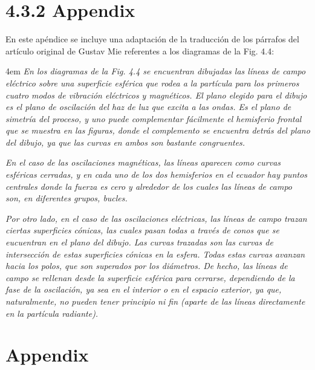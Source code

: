 \documentclass[graybox]{svmult}
\begin{document}
\section*{4.3.2 Appendix}

En este apéndice se incluye una adaptación de la traducción de los párrafos del artículo original de Gustav Mie\cite{Mie1908} referentes a los diagramas de la Fig. 4.4:

\vspace{5mm}

\par
\begingroup
\leftskip4em
\rightskip\leftskip
\textit{En los diagramas de la Fig. 4.4 se encuentran dibujadas las líneas de campo eléctrico sobre una superficie esférica que rodea a la partícula para los primeros cuatro modos de vibración eléctricos y magnéticos. El plano elegido para el dibujo es el plano de oscilación del haz de luz que excita a las ondas. Es el plano de simetría del proceso, y uno puede complementar fácilmente el hemisferio frontal que se muestra en las figuras, donde el complemento se encuentra detrás del plano del dibujo, ya que las curvas en ambos son bastante congruentes.}

\textit{En el caso de las oscilaciones magnéticas, las líneas aparecen como curvas esféricas cerradas, y en cada uno de los dos hemisferios en el ecuador hay puntos centrales donde la fuerza es cero y alrededor de los cuales las líneas de campo son, en diferentes grupos, bucles.}

\textit{Por otro lado, en el caso de las oscilaciones eléctricas, las líneas de campo trazan ciertas superficies cónicas, las cuales pasan todas a través de conos que se eucuentran en el plano del dibujo. Las curvas trazadas son las curvas de intersección de estas superficies cónicas en la esfera. Todas estas curvas avanzan hacia los polos, que son superados por los diámetros. De hecho, las líneas de campo se rellenan desde la superficie esférica para cerrarse, dependiendo de la fase de la oscilación, ya sea en el interior o en el espacio exterior, ya que, naturalmente, no pueden tener principio ni fin (aparte de las líneas directamente en la partícula radiante).}
\par
\endgroup
 
\section*{Appendix}
%
%




\end{document}
